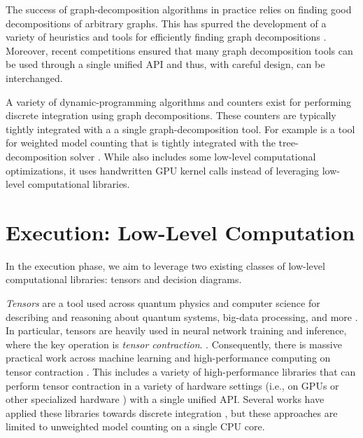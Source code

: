The success of graph-decomposition algorithms in practice relies on finding good decompositions of arbitrary graphs.
This has spurred the development of a variety of heuristics and tools for efficiently finding graph decompositions \cite{AMW17,HS18,Tamaki17,hicks02}. 
Moreover, recent competitions \cite{DKTW18} ensured that many graph decomposition tools can be used through a single unified API and thus, with careful design, can be interchanged.

A variety of dynamic-programming algorithms \cite{FMR08,SS10} and counters \cite{CW16,FHMW17,FHWZ18,FHZ19} exist for performing discrete integration using graph decompositions.
These counters are typically tightly integrated with a a single graph-decomposition tool.
For example  \cite{FHWZ18,FHZ19} is a tool for weighted model counting that is tightly integrated with the tree-decomposition solver  \cite{AMW17}. While  also includes some low-level computational optimizations, it uses handwritten GPU kernel calls instead of leveraging low-level computational libraries.


\section{Execution: Low-Level Computation}
\label{sec:intro:execution}
In the execution phase, we aim to leverage two existing classes of low-level computational libraries: tensors and decision diagrams. 

\emph{Tensors} are a tool used across quantum physics and computer science for describing and reasoning about quantum systems, big-data processing, and more \cite{BB17,Cichocki14,Orus19}.
In particular, tensors are heavily used in neural network training and inference, where the key operation is \emph{tensor contraction}. \cite{BK07,Hirata03,KKCLA17,VZTGDMVAC18}.
Consequently, there is massive practical work across machine learning and high-performance computing on tensor contraction \cite{BK07,Hirata03,KKCLA17,VZTGDMVAC18}.
This includes a variety of high-performance libraries that can perform tensor contraction \cite{numpy,ABCCDDDGII16,PGMLJGKLGA19} in a variety of hardware settings (i.e., on GPUs \cite{KSTKPPRS19,NRBHHJN15} or other specialized hardware \cite{JYPPABBBBB17}) with a single unified API.
Several works have applied these libraries towards discrete integration \cite{BMT15,KCMR18}, but these approaches are limited to unweighted model counting on a single CPU core.


